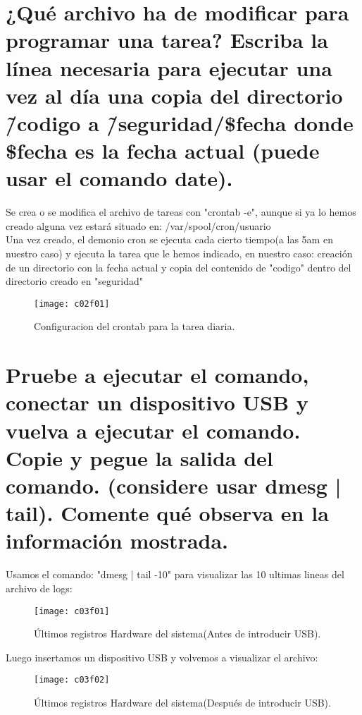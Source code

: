 \section{¿Qué archivo ha de modificar para programar una tarea? Escriba la línea necesaria para ejecutar una vez al día una copia del directorio \~/codigo a \~/seguridad/\$fecha donde \$fecha es la fecha actual	(puede usar el comando date). \cite{c02}}

Se crea o se modifica el archivo de tareas con "crontab -e", aunque si ya lo hemos creado alguna vez estará situado en: /var/spool/cron/usuario\\

Una vez creado, el demonio cron se ejecuta cada cierto tiempo(a las 5am en nuestro caso) y ejecuta la tarea que le hemos indicado, en nuestro caso: creación de un directorio con la fecha actual y copia del contenido de "codigo" dentro del directorio creado en "seguridad"

\begin{figure}[H]
	\centering
	\texttt{[image: c02f01]}
	\caption{Configuracion del crontab para la tarea diaria.}
	\label{fig:c02f01}
\end{figure}


\clearpage
\section{Pruebe a ejecutar el comando, conectar un dispositivo USB y vuelva a ejecutar el comando. Copie y pegue la salida del comando. (considere usar dmesg | tail). Comente qué observa en la información mostrada.}

Usamos el comando: "dmesg | tail -10" para visualizar las 10 ultimas lineas del archivo de logs:

\begin{figure}[H]
	\centering
	\texttt{[image: c03f01]}
	\caption{Últimos registros Hardware del sistema(Antes de introducir USB).}
	\label{fig:c03f01}
\end{figure}

Luego insertamos un dispositivo USB y volvemos a visualizar el archivo:

\begin{figure}[H]
	\centering
	\texttt{[image: c03f02]}
	\caption{Últimos registros Hardware del sistema(Después de introducir USB).}
	\label{fig:c03f02}
\end{figure}

